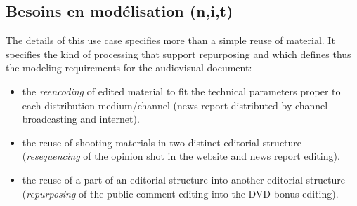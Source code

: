 

\subsection{Besoins en modélisation (n,i,t)}
The details of this use case specifies more than a simple reuse of material. It specifies the kind of processing that support repurposing and which defines thus the modeling requirements for the audiovisual document:
\begin{itemize}
	\item the \textit{reencoding} of edited material to fit the technical parameters proper to each distribution medium/channel (news report distributed by channel broadcasting and internet).
	
	\item the reuse of shooting materials in two distinct editorial structure (\textit{resequencing} of the opinion shot in the website and news report editing).

	\item the reuse of a part of an editorial structure into another editorial structure (\textit{repurposing} of the public comment editing into the DVD bonus editing). 
\end{itemize}

